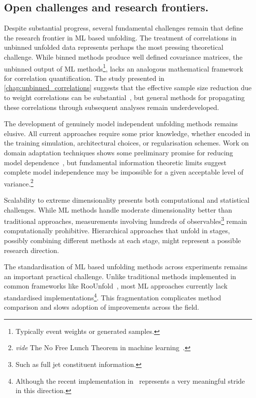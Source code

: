     \subsection{Open challenges and research frontiers.}
        Despite substantial progress, several fundamental challenges remain that define the research frontier in ML based unfolding.
        The treatment of correlations in unbinned unfolded data represents perhaps the most pressing theoretical challenge.
        While binned methods produce well defined covariance matrices, the unbinned output of ML methods\footnote{Typically event weights or generated samples.}, lacks an analogous mathematical framework for correlation quantification.
        The study presented in \cref{chap:unbinned_correlations} suggests that the effective sample size reduction due to weight correlations can be substantial~\cite{Desai:2025mpy}, but general methods for propagating these correlations through subsequent analyses remain underdeveloped.
        
        The development of genuinely model independent unfolding methods remains elusive.
        All current approaches require some prior knowledge, whether encoded in the training simulation, architectural choices, or regularisation schemes.
        Work on domain adaptation techniques shows some preliminary promise for reducing model dependence~\cite{Terjek2019AdversarialRegularization}, but fundamental information theoretic limits suggest complete model independence may be impossible for a given acceptable level of variance.\footnote{\textit{vide} The {No Free Lunch Theorem} in machine learning~\cite{wolpertNoFreeLunch1997}.}
        
        Scalability to extreme dimensionality presents both computational and statistical challenges.
        While ML methods handle moderate dimensionality better than traditional approaches, measurements involving hundreds of observables\footnote{Such as full jet constituent information.} remain computationally prohibitive.
        Hierarchical approaches that unfold in stages, possibly combining different methods at each stage, might represent a possible research direction.
        
        The standardisation of ML based unfolding methods across experiments remains an important practical challenge.
        Unlike traditional methods implemented in common frameworks like RooUnfold~\cite{adye_unfolding_2011}, most ML approaches currently lack standardised implementations\footnote{Although the recent implementation in~\cite{OmnifoldOmniFoldLibrary} represents a very meaningful stride in this direction.}.
        This fragmentation complicates method comparison and slows adoption of improvements across the field.

